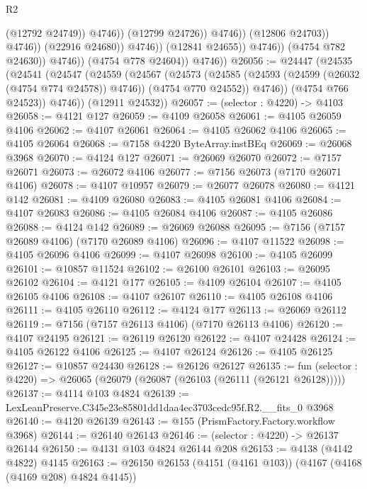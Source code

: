 \begin{lexlean}{R2}
\begin{coremodule}
                                              (@12792 @24749))
                                            @4746))
                                        (@12799 @24726))
                                      @4746))
                                  (@12806 @24703))
                                @4746))
                            (@22916 @24680))
                          @4746))
                      (@12841 @24655))
                    @4746))
                (@4754 @782 @24630))
              @4746))
          (@4754 @778 @24604))
        @4746))
@26056 := @24447
    (@24535
      (@24541
        (@24547
          (@24559
            (@24567
              (@24573
                (@24585 (@24593 (@24599 (@26032 (@4754 @774 @24578)) @4746)) (@4754 @770 @24552))
                @4746))
            (@4754 @766 @24523))
          @4746))
      (@12911 @24532))
@26057 := (selector : @4220) -> @4103
@26058 := @4121 @127
@26059 := @4109 @26058
@26061 := @4105 @26059 @4106
@26062 := @4107 @26061
@26064 := @4105 @26062 @4106
@26065 := @4105 @26064
@26068 := @7158 @4220 ByteArray.instBEq
@26069 := @26068 @3968
@26070 := @4124 @127
@26071 := @26069 @26070
@26072 := @7157 @26071
@26073 := @26072 @4106
@26077 := @7156 @26073 (@7170 @26071 @4106)
@26078 := @4107 @10957
@26079 := @26077 @26078
@26080 := @4121 @142
@26081 := @4109 @26080
@26083 := @4105 @26081 @4106
@26084 := @4107 @26083
@26086 := @4105 @26084 @4106
@26087 := @4105 @26086
@26088 := @4124 @142
@26089 := @26069 @26088
@26095 := @7156 (@7157 @26089 @4106) (@7170 @26089 @4106)
@26096 := @4107 @11522
@26098 := @4105 @26096 @4106
@26099 := @4107 @26098
@26100 := @4105 @26099
@26101 := @10857 @11524
@26102 := @26100 @26101
@26103 := @26095 @26102
@26104 := @4121 @177
@26105 := @4109 @26104
@26107 := @4105 @26105 @4106
@26108 := @4107 @26107
@26110 := @4105 @26108 @4106
@26111 := @4105 @26110
@26112 := @4124 @177
@26113 := @26069 @26112
@26119 := @7156 (@7157 @26113 @4106) (@7170 @26113 @4106)
@26120 := @4107 @24195
@26121 := @26119 @26120
@26122 := @4107 @24428
@26124 := @4105 @26122 @4106
@26125 := @4107 @26124
@26126 := @4105 @26125
@26127 := @10857 @24430
@26128 := @26126 @26127
@26135 := fun (selector : @4220) => @26065 (@26079 (@26087 (@26103 (@26111 (@26121 @26128)))))
@26137 := @4114 @103 @4824
@26139 := LexLeanPreserve.C345e23e85801dd1daa4ec3703cedc95f.R2.__fits_0 @3968
@26140 := @4120 @26139
@26143 := @155 (PrismFactory.Factory.workflow @3968)
@26144 := @26140 @26143
@26146 := (selector : @4220) -> @26137 @26144
@26150 := @4131 @103 @4824 @26144 @208
@26153 := @4138 (@4142 @4822) @4145
@26163 := @26150 @26153 (@4151 (@4161 @103)) (@4167 (@4168 (@4169 @208) @4824 @4145))

\end{coremodule}
\end{lexlean}
